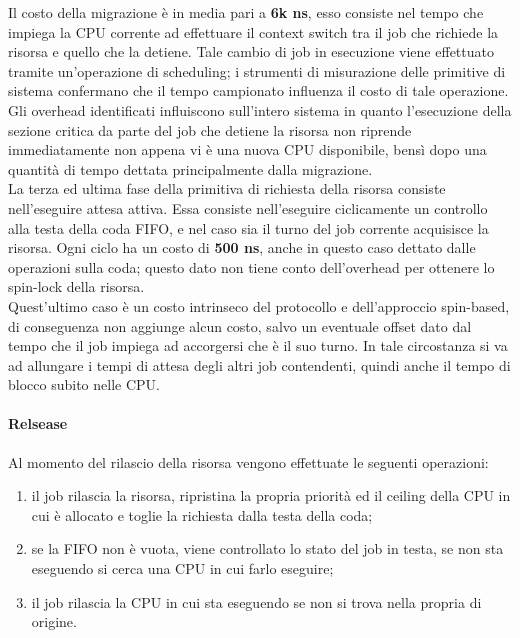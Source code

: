 \noindent Il costo della migrazione è in media pari a \textbf{6k ns}, esso consiste nel tempo che impiega la CPU corrente ad effettuare il context switch tra il job che richiede la risorsa e quello che la detiene. Tale cambio di job in esecuzione viene effettuato tramite un'operazione di scheduling; i strumenti di misurazione delle primitive di sistema confermano che il tempo campionato influenza il costo di tale operazione.\\

\noindent Gli overhead identificati influiscono sull'intero sistema in quanto l'esecuzione della sezione critica da parte del job che detiene la risorsa non riprende immediatamente non appena vi è una nuova CPU disponibile, bensì dopo una quantità di tempo dettata principalmente dalla migrazione.\\

\noindent La terza ed ultima fase della primitiva di richiesta della risorsa consiste nell'eseguire attesa attiva. Essa consiste nell'eseguire ciclicamente un controllo alla testa della coda FIFO, e nel caso sia il turno del job corrente acquisisce la risorsa. Ogni ciclo ha un costo di \textbf{500 ns}, anche in questo caso dettato dalle operazioni sulla coda; questo dato non tiene conto dell'overhead per ottenere lo spin-lock della risorsa.\\

\noindent Quest'ultimo caso è un costo intrinseco del protocollo e dell'approccio spin-based, di conseguenza non aggiunge alcun costo, salvo un eventuale offset dato dal tempo che il job impiega ad accorgersi che è il suo turno. In tale circostanza si va ad allungare i tempi di attesa degli altri job contendenti, quindi anche il tempo di blocco subito nelle CPU.\\

\paragraph{Relsease} Al momento del rilascio della risorsa vengono effettuate le seguenti operazioni:

\begin{enumerate}
	\item il job rilascia la risorsa, ripristina la propria priorità ed il ceiling della CPU in cui è allocato e toglie la richiesta dalla testa della coda;
	\item se la FIFO non è vuota, viene controllato lo stato del job in testa, se non sta eseguendo si cerca una CPU in cui farlo eseguire;
	\item il job rilascia la CPU in cui sta eseguendo se non si trova nella propria di origine.
\end{enumerate}

